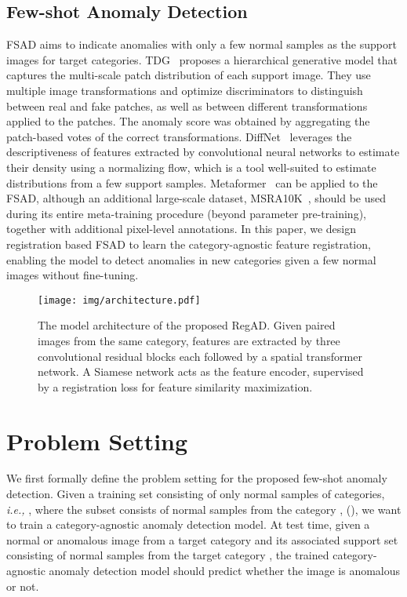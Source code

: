 \documentclass[runningheads]{llncs}
\begin{document}
\subsection{Few-shot Anomaly Detection}
FSAD aims to indicate anomalies with only a few normal samples as the support images for target categories. TDG~\cite{TDG} proposes a hierarchical generative model that captures the multi-scale patch distribution of each support image. They use multiple image transformations and optimize discriminators to distinguish between real and fake patches, as well as between different transformations applied to the patches. The anomaly score was obtained by aggregating the patch-based votes of the correct transformations.
DiffNet~\cite{DiffNet} leverages the descriptiveness of features extracted by convolutional neural networks to estimate their density using a normalizing flow, which is a tool well-suited to estimate distributions from a few support samples. Metaformer~\cite{metaformer} can be applied to the FSAD, although an additional large-scale dataset, MSRA10K~\cite{msra10k}, should be used during its entire meta-training procedure (beyond parameter pre-training), together with additional pixel-level annotations. In this paper, we design registration based FSAD to learn the category-agnostic feature registration, enabling the model to detect anomalies in new categories given a few normal images without fine-tuning. 

\begin{figure}[t]
\centering
\texttt{[image: img/architecture.pdf]}
\caption{The model architecture of the proposed RegAD. Given paired images from the same category, features are extracted by three convolutional residual blocks each followed by a spatial transformer network. A Siamese network acts as the feature encoder, supervised by a registration loss for feature similarity maximization.}
\label{img:RegAD}
\end{figure}

\section{Problem Setting}
\label{sec:PS}
We first formally define the problem setting for the proposed few-shot anomaly detection. Given a training set consisting of only normal samples of  categories, \emph{i.e.,} , where the subset  consists of normal samples from the category , (), we want to train a category-agnostic anomaly detection model. At test time, given a normal or anomalous image from a target category  and its associated support set  consisting of  normal samples from the target category , the trained category-agnostic anomaly detection model should predict whether the image is anomalous or not.
\end{document}
